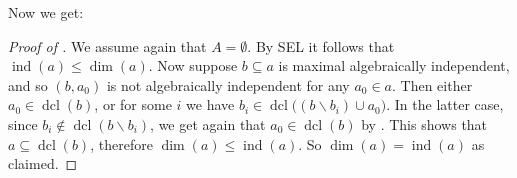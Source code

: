 \documentclass[a4paper]{report}
\newcommand{\ind}{\hspace{15pt}}
\DeclareMathOperator{\dcl}{dcl}
\DeclareMathOperator{\aind}{ind}
\theoremstyle{definition}
\theoremstyle{remstyle}
\begin{document}
\ind Now we get:

\begin{proof}[Proof of ]
	We assume again that $A=\emptyset$. By SEL it follows that $\aind(a)\leq\dim(a)$. Now suppose $b\subseteq a$ is maximal algebraically independent, and so $(b,a_0)$ is not algebraically independent for any $a_0\in a$. Then either $a_0\in\dcl(b)$, or for some $i$ we have $b_i\in\dcl\big((b\backslash b_i)\cup a_0\big)$. In the latter case, since $b_i\not\in\dcl(b\backslash b_i)$, we get again that $a_0\in\dcl(b)$ by . This shows that $a\subseteq\dcl(b)$, therefore $\dim(a)\leq\aind(a)$. So $\dim(a)=\aind(a)$ as claimed.
\end{proof}



\newpage
\clearpage
\pagestyle{plain}
\end{document}
